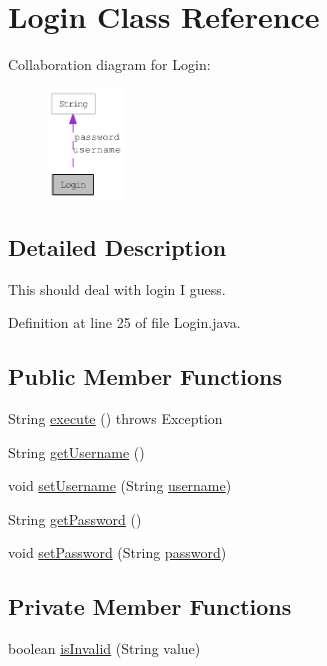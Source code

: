 \hypertarget{classLogin}{
\section{Login Class Reference}
\label{classLogin}
}
Collaboration diagram for Login:\nopagebreak
\begin{figure}[H]
\begin{center}
\leavevmode
\includegraphics[width=58pt]{classLogin__coll__graph}
\end{center}
\end{figure}


\subsection{Detailed Description}
This should deal with login I guess. 

Definition at line 25 of file Login.java.\subsection*{Public Member Functions}
\begin{CompactItemize}
\item 
String \hyperlink{classLogin_f33faf44bca35f89e27d3b5c53869365}{execute} ()  throws Exception 
\item 
String \hyperlink{classLogin_e60341bb4848c8cb62211996ab158ca1}{getUsername} ()
\item 
void \hyperlink{classLogin_f74824b6877de3abddc6452bd35113b2}{setUsername} (String \hyperlink{classLogin_d2b4d8a7c18f724cef7e3494e15a3f0a}{username})
\item 
String \hyperlink{classLogin_a14a0020dc57ae10a4128bf964958f16}{getPassword} ()
\item 
void \hyperlink{classLogin_314ab415c9a6709bc6f41291e72bb2c5}{setPassword} (String \hyperlink{classLogin_073065569cb434a1d28d841123d4d137}{password})
\end{CompactItemize}
\subsection*{Private Member Functions}
\begin{CompactItemize}
\item 
boolean \hyperlink{classLogin_79c55a63f21caff65ec04a20cb9922d0}{isInvalid} (String value)
\end{CompactItemize}
